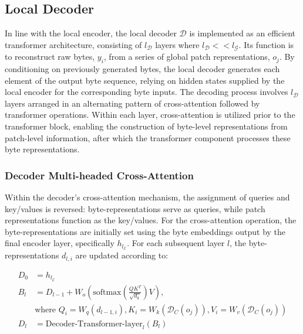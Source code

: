 \subsection{Local Decoder} 

In line with the local encoder, the local decoder $\mathcal{D}$ is implemented as an efficient transformer architecture, consisting of $l_{\mathcal{D}}$ layers where $l_{\mathcal{D}} << l_{\mathcal{G}}$. Its function is to reconstruct raw bytes, $y_i$, from a series of global patch representations, $o_j$. By conditioning on previously generated bytes, the local decoder generates each element of the output byte sequence, relying on hidden states supplied by the local encoder for the corresponding byte inputs. The decoding process involves $l_{\mathcal{D}}$ layers arranged in an alternating pattern of cross-attention followed by transformer operations. Within each layer, cross-attention is utilized prior to the transformer block, enabling the construction of byte-level representations from patch-level information, after which the transformer component processes these byte representations.

\subsubsection{Decoder Multi-headed Cross-Attention} 

Within the decoder’s cross-attention mechanism, the assignment of queries and key/values is reversed: byte-representations serve as queries, while patch representations function as the key/values. For the cross-attention operation, the byte-representations are initially set using the byte embeddings output by the final encoder layer, specifically $h_{l_{\mathcal{E}}}$. For each subsequent layer $l$, the byte-representations $d_{l,i}$ are updated according to:

\begin{align}
D_0 &= h_{l_{\mathcal{E}}} \\
B_l &= D_{l-1} + W_o\left(\text{softmax}\left(\frac{QK^T}{\sqrt{d_k}}\right)V\right), \\
  &\text{where } Q_i = W_q(d_{l-1,i}), K_i = W_k(\mathcal{D}_C(o_j)), V_i = W_v(\mathcal{D}_C(o_j)) \\
  D_l &= \text{Decoder-Transformer-layer}_l(B_l)
\end{align}

